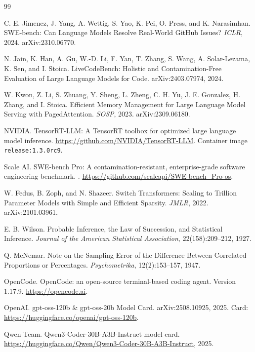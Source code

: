 \documentclass[10pt,twocolumn]{article}
\newcommand{\code}[1]{\texttt{\small #1}}
\begin{document}
\begin{thebibliography}{99}

C. E. Jimenez, J. Yang, A. Wettig, S. Yao, K. Pei, O. Press, and K. Narasimhan.
\newblock SWE-bench: Can Language Models Resolve Real-World GitHub Issues?
\newblock \emph{ICLR}, 2024. arXiv:2310.06770.

N. Jain, K. Han, A. Gu, W.-D. Li, F. Yan, T. Zhang, S. Wang, A. Solar-Lezama,
K. Sen, and I. Stoica.
\newblock LiveCodeBench: Holistic and Contamination-Free Evaluation of Large Language Models for Code.
\newblock arXiv:2403.07974, 2024.

W. Kwon, Z. Li, S. Zhuang, Y. Sheng, L. Zheng, C. H. Yu, J. E. Gonzalez, H. Zhang, and I. Stoica.
\newblock Efficient Memory Management for Large Language Model Serving with PagedAttention.
\newblock \emph{SOSP}, 2023. arXiv:2309.06180.

NVIDIA.
\newblock TensorRT-LLM: A TensorRT toolbox for optimized large language model inference.
\newblock \url{https://github.com/NVIDIA/TensorRT-LLM}. Container image \code{release:1.3.0rc9}.

Scale AI.
\newblock SWE-bench Pro: A contamination-resistant, enterprise-grade software engineering benchmark.
. \url{https://github.com/scaleapi/SWE-bench_Pro-os}.

W. Fedus, B. Zoph, and N. Shazeer.
\newblock Switch Transformers: Scaling to Trillion Parameter Models with Simple and Efficient Sparsity.
\newblock \emph{JMLR}, 2022. arXiv:2101.03961.

E. B. Wilson.
\newblock Probable Inference, the Law of Succession, and Statistical Inference.
\newblock \emph{Journal of the American Statistical Association}, 22(158):209--212, 1927.

Q. McNemar.
\newblock Note on the Sampling Error of the Difference Between Correlated Proportions or Percentages.
\newblock \emph{Psychometrika}, 12(2):153--157, 1947.

OpenCode.
\newblock OpenCode: an open-source terminal-based coding agent. Version 1.17.9.
\newblock \url{https://opencode.ai}.

OpenAI.
\newblock gpt-oss-120b \& gpt-oss-20b Model Card.
\newblock arXiv:2508.10925, 2025. Card: \url{https://huggingface.co/openai/gpt-oss-120b}.

Qwen Team.
\newblock Qwen3-Coder-30B-A3B-Instruct model card.
\newblock \url{https://huggingface.co/Qwen/Qwen3-Coder-30B-A3B-Instruct}, 2025.


\end{thebibliography}
\end{document}
